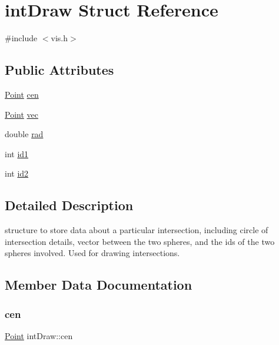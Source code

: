 \hypertarget{structint_draw}{}\section{int\+Draw Struct Reference}
\label{structint_draw}


{\ttfamily \#include $<$vis.\+h$>$}

\subsection*{Public Attributes}
\begin{DoxyCompactItemize}
\item 
\mbox{\hyperlink{struct_point}{Point}} \mbox{\hyperlink{structint_draw_af1dad79cd2a2fd363e908b413bbbc128}{cen}}
\item 
\mbox{\hyperlink{struct_point}{Point}} \mbox{\hyperlink{structint_draw_a527717b140f7983792ea0baeb1a3f234}{vec}}
\item 
double \mbox{\hyperlink{structint_draw_a9614ba917e8a2c0f7b782b72d12ba67b}{rad}}
\item 
int \mbox{\hyperlink{structint_draw_a96bf5f7cd19d3a83bd5a53f2fa0aeb71}{id1}}
\item 
int \mbox{\hyperlink{structint_draw_a25ba59d3175591863f4e240e4fe6bd13}{id2}}
\end{DoxyCompactItemize}


\subsection{Detailed Description}
structure to store data about a particular intersection, including circle of intersection details, vector between the two spheres, and the ids of the two spheres involved. Used for drawing intersections. 

\subsection{Member Data Documentation}
\mbox{\label{structint_draw_af1dad79cd2a2fd363e908b413bbbc128}} 
\subsubsection{\texorpdfstring{cen}{cen}}
{\footnotesize\ttfamily \mbox{\hyperlink{struct_point}{Point}} int\+Draw\+::cen}

